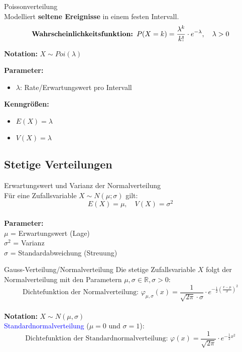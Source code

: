 \begin{definition}{Poissonverteilung}\\
Modelliert \textbf{seltene Ereignisse} in einem festen Intervall.
$$\text{\textbf{Wahrscheinlichkeitsfunktion: }}P(X=k) = \frac{\lambda^k}{k!} \cdot e^{-\lambda}, \quad \lambda > 0$$

\begin{minipage}[t]{0.6\textwidth}
\textbf{Notation:} $X \sim Poi(\lambda)$

\textbf{Parameter:}
\begin{itemize}
    \item $\lambda$: Rate/Erwartungswert pro Intervall
\end{itemize}
\end{minipage}
\begin{minipage}[t]{0.38\textwidth}
\textbf{Kenngrößen:}
\begin{itemize}
    \item $E(X) = \lambda$
    \item $V(X) = \lambda$
\end{itemize}
\end{minipage}
\end{definition}







\subsection{Stetige Verteilungen}

\begin{concept}{Erwartungswert und Varianz der Normalverteilung}\\
Für eine Zufallsvariable $X \sim N(\mu;\sigma)$ gilt:
$$
E(X) = \mu, \quad V(X) = \sigma^2
$$
\vspace{-6mm}\\
\textbf{Parameter:}\\
$\mu$ = Erwartungswert (Lage)\\
$\sigma^2$ = Varianz\\
$\sigma$ = Standardabweichung (Streuung)
\end{concept}

\begin{definition}{Gauss-Verteilung/Normalverteilung}
Die stetige Zufallsvariable $X$ folgt der Normalverteilung mit den Parametern $\mu, \sigma \in \mathbb{R}, \sigma>0$:
\vspace{-2mm}\\
$$
\text{Dichtefunktion der Normalverteilung: }\varphi_{\mu,\sigma}(x)=\frac{1}{\sqrt{2\pi} \cdot \sigma} \cdot e^{-\frac{1}{2}(\frac{x-\mu}{\sigma})^2}
$$
\vspace{-5mm}\\
\textbf{Notation:} $X \sim N(\mu,\sigma)$
\vspace{2mm}\\
\textcolor{blue}{Standardnormalverteilung} ($\mu=0$ und $\sigma=1$):
\vspace{-3mm}\\
$$
\text{Dichtefunktion der Standardnormalverteilung: }\varphi(x)=\frac{1}{\sqrt{2\pi}} \cdot e^{-\frac{1}{2}x^2}
$$
\end{definition}

